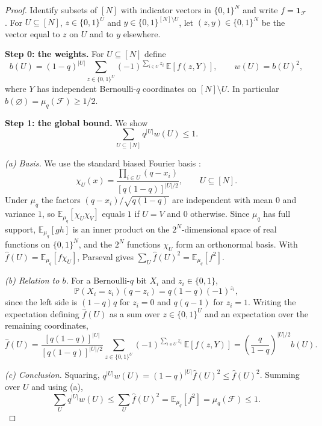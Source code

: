 \documentclass[11pt,letterpaper]{article}
\theoremstyle{definition}
\theoremstyle{remark}
\numberwithin{equation}{section}
\begin{document}
\begin{proof}
Identify subsets of $[N]$ with indicator vectors in $\{0,1\}^N$ and write $f=\mathbf 1_{\mathcal F}$. For $U\subseteq[N]$, $z\in\{0,1\}^U$ and $y\in\{0,1\}^{[N]\setminus U}$, let $(z,y)\in\{0,1\}^N$ be the vector equal to $z$ on $U$ and to $y$ elsewhere.

\medskip\noindent\textbf{Step 0: the weights.} For $U\subseteq[N]$ define
\begin{equation}\label{eq:weights-definition}
 b(U)=(1-q)^{|U|}
 \sum_{z\in\{0,1\}^{U}}(-1)^{\sum_{i\in U}z_i}\,
 \mathbb E[f(z,Y)],
 \qquad w(U)=b(U)^2,
\end{equation}
where $Y$ has independent Bernoulli-$q$ coordinates on $[N]\setminus U$. In particular $b(\varnothing)=\mu_q(\mathcal F)\ge1/2$.

\medskip\noindent\textbf{Step 1: the global bound.} We show
\begin{equation}\label{eq:global-weight-bound}
\sum_{U\subseteq[N]}q^{|U|}w(U)\le1.
\end{equation}

\emph{(a) Basis.} We use the standard biased Fourier basis \cite[Section~8.4]{ODonnell14}:
\[
 \chi_U(x)=\frac{\prod_{i\in U}(q-x_i)}{[q(1-q)]^{|U|/2}},
 \qquad U\subseteq[N].
\]
Under $\mu_q$ the factors $(q-x_i)/\sqrt{q(1-q)}$ are independent with mean $0$ and variance $1$, so $\mathbb E_{\mu_q}[\chi_U\chi_V]$ equals $1$ if $U=V$ and $0$ otherwise. Since $\mu_q$ has full support, $\mathbb E_{\mu_q}[gh]$ is an inner product on the $2^N$-dimensional space of real functions on $\{0,1\}^N$, and the $2^N$ functions $\chi_U$ form an orthonormal basis. With $\widehat f(U)=\mathbb E_{\mu_q}[f\chi_U]$, Parseval gives $\sum_U\widehat f(U)^2=\mathbb E_{\mu_q}[f^2]$.

\emph{(b) Relation to $b$.} For a Bernoulli-$q$ bit $X_i$ and $z_i\in\{0,1\}$,
\[
 \mathbb P(X_i=z_i)(q-z_i)=q(1-q)(-1)^{z_i},
\]
since the left side is $(1-q)q$ for $z_i=0$ and $q(q-1)$ for $z_i=1$. Writing the expectation defining $\widehat f(U)$ as a sum over $z\in\{0,1\}^U$ and an expectation over the remaining coordinates,
\[
 \widehat f(U)
 =\frac{[q(1-q)]^{|U|}}{[q(1-q)]^{|U|/2}}
 \sum_{z\in\{0,1\}^{U}}(-1)^{\sum_{i\in U}z_i}\,
 \mathbb E[f(z,Y)]
 =\left(\frac{q}{1-q}\right)^{|U|/2}b(U).
\]

\emph{(c) Conclusion.} Squaring, $q^{|U|}w(U)=(1-q)^{|U|}\widehat f(U)^2\le\widehat f(U)^2$. Summing over $U$ and using (a),
\[
\sum_{U}q^{|U|}w(U)\le\sum_U\widehat f(U)^2=\mathbb E_{\mu_q}[f^2]=\mu_q(\mathcal F)\le1.
\]


\end{proof}
\end{document}
